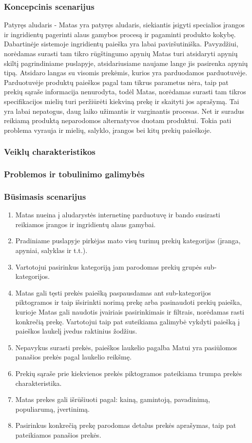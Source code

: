 \documentclass[oneside]{VUMIFPSkursinis}
\begin{document}
		\subsubsection{Koncepcinis scenarijus}
			Patyręs aludaris - Matas yra patyręs aludaris, siekiantis įsigyti specialios įrangos ir ingridientų pagerinti alaus gamybos procesą ir pagaminti produkto kokybę.
			Dabartinėje sistemoje ingridientų paieška yra labai paviršutiniška.
			Pavyzdžiui, norėdamas surasti tam tikro rūgštingumo apynių Matas turi atsidaryti apynių skiltį pagrindiniame puslapyje, atsidariusiame naujame lange jis pasirenka apynių tipą.
			Atsidaro langas su visomis prekėmis, kurios yra parduodamos parduotuvėje.
			Parduotuvėje produktų paieškos pagal tam tikrus parametus nėra, taip pat prekių sąraše informacija nenurodyta, todėl Matas, norėdamas surasti tam tikros specifikacijos mielių turi peržiūrėti kiekviną prekę ir skaityti jos aprašymą.
			Tai yra labai nepatogus, daug laiko užimantis ir varginantis procesas.
			Net ir suradus reikiamą produktą neparodomos alternatyvos duotam produktui.
			Tokia pati problema vyrauja ir mielių, salyklo, įrangos bei kitų prekių paieškoje.
		\subsubsection{Veiklų charakteristikos}
		\subsubsection{Problemos ir tobulinimo galimybės}
		\subsubsection{Būsimasis scenarijus}
			\begin{enumerate}
				\item{Matas nueina į aludarystės internetinę parduotuvę ir bando susirasti reikiamos įrangos ir ingridientų alaus gamybai.}
				\item{Pradiniame puslapyje pirkėjas mato visų turimų prekių kategorijas (įranga, apyniai, salyklas ir t.t.).}
				\item{Vartotojui pasirinkus kategoriją jam parodomas prekių grupės sub-kategorijos.}
				\item{Matas gali tęsti prekės paiešką paspausdamas ant sub-kategorijos piktogramos ir taip išsirinkti norimą prekę arba pasinaudoti prekių paieška, kurioje Matas gali naudotis įvairiais  pasirinkimais ir filtrais, norėdamas rasti konkrečią prekę. Vartotojui taip pat suteikiama galimybė vykdyti paiešką į paieškos laukelį įvedus raktinius žodžius.}
				\item{Nepavykus surasti prekės, paieškos laukelio pagalba Matui yra pasiūlomos panašios prekės pagal laukelio reikšmę.}
				\item{Prekių sąraše prie kiekvienos prekės piktogramos pateikiama trumpa prekės charakteristika. }
				\item{Matas prekes gali išrūšiuoti pagal: kainą, gamintoją, pavadinimą, populiarumą, įvertinimą.}
				\item{Pasirinkus konkrečią prekę parodomas detalus prekės aprašymas, taip pat pateikiamos panašios prekės.}
			\end{enumerate}
\end{document}
